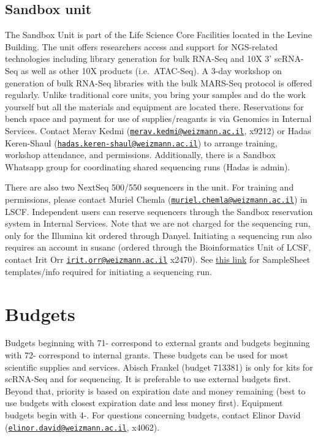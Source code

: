 \documentclass[]{book}
\begin{document}
\section{Sandbox unit}\label{sandbox-unit}

The Sandbox Unit is part of the Life Science Core Facilities located in
the Levine Building. The unit offers researchers access and support for
NGS-related technologies including library generation for bulk RNA-Seq
and 10X 3' scRNA-Seq as well as other 10X products (i.e.~ATAC-Seq). A
3-day workshop on generation of bulk RNA-Seq libraries with the bulk
MARS-Seq protocol is offered regularly. Unlike traditional core units,
you bring your samples and do the work yourself but all the materials
and equipment are located there. Reservations for bench space and
payment for use of supplies/reagants is via Genomics in Internal
Services. Contact Merav Kedmi
(\href{mailto:merav.kedmi@weizmann.ac.il}{\nolinkurl{merav.kedmi@weizmann.ac.il}},
x9212) or Hadas Keren-Shaul
(\href{mailto:hadas.keren-shaul@weizmann.ac.il}{\nolinkurl{hadas.keren-shaul@weizmann.ac.il}})
to arrange training, workshop attendance, and permissions. Additionally,
there is a Sandbox Whatsapp group for coordinating shared sequencing
runs (Hadas is admin).

There are also two NextSeq 500/550 sequencers in the unit. For training
and permissions, please contact Muriel Chemla
(\href{mailto:muriel.chemla@weizmann.ac.il}{\nolinkurl{muriel.chemla@weizmann.ac.il}})
in LSCF. Independent users can reserve sequencers through the Sandbox
reservation system in Internal Services. Note that we are not charged
for the sequencing run, only for the Illumina kit ordered through
Danyel. Initiating a sequencing run also requires an account in susanc
(ordered through the Bioinformatics Unit of LCSF, contact Irit Orr
\href{mailto:irit.orr@weizmann.ac.il}{\nolinkurl{irit.orr@weizmann.ac.il}}
x2470). See
\href{https://susanc.weizmann.ac.il/static/doc//howto.html}{this link}
for SampleSheet templates/info required for initiating a sequencing run.

\chapter{Budgets}\label{budgets}

Budgets beginning with 71- correspond to external grants and budgets
beginning with 72- correspond to internal grants. These budgets can be
used for most scientific supplies and services. Abisch Frankel (budget
713381) is only for kits for scRNA-Seq and for sequencing. It is
preferable to use external budgets first. Beyond that, priority is based
on expiration date and money remaining (best to use budgets with closest
expiration date and less money first). Equipment budgets begin with 4-.
For questions concerning budgets, contact Elinor David
(\href{mailto:elinor.david@weizmann.ac.il}{\nolinkurl{elinor.david@weizmann.ac.il}},
x4062).
\end{document}
